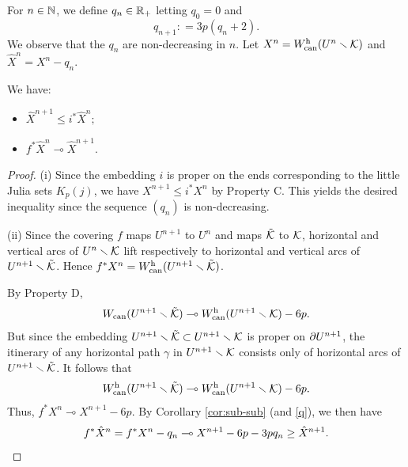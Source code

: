 \begin{center}
\end{center}

For $n \in {\Bbb N}$, 
we define $q_n\in {\Bbb R}_+$ letting $q_0 = 0$ and 
\begin{equation}\label{q}
                 q_{n+1}: =  3p(q_n+2).
\end{equation}
We observe that the $q_n$ are non-decreasing in $n$. 
Let $X^n = W_{\mathrm{can}}^{\mathrm{h}} (U^n\smallsetminus {\mathcal K})$ and $\hat X^n= X^n- q_n$.

\begin{prop}\label{restrictions}
  We have:
\begin{itemize}

\item [(i)] $\hat X^{n+1} \leq i^* \hat X^n;$

\item [(ii)] $f^* \hat X^n\multimap \hat X^{n+1}.$

\end{itemize}
\end{prop}

\begin{proof} (i)
Since the embedding $i$ is proper on the ends corresponding to the little Julia sets $K_p(j)$,
we have  $X^{n+1} \leq i^* X^n$ by Property C.
This yields the desired inequality
since the sequence $(q_n)$ is non-decreasing.

\msk (ii)
Since the covering $f$ maps $U^{n+1}$ to $U^n$ and maps $\tilde{{\mathcal K}}$ to ${\mathcal K}$,
horizontal and vertical  arcs of $U^n\smallsetminus {\mathcal K}$ lift respectively to horizontal and vertical arcs
of $U^{n+1}\smallsetminus \tilde {{\mathcal K}}$. Hence  $f^* X^n = W_{\mathrm{can}}^{\mathrm{h}}(U^{n+1}\smallsetminus \tilde{{\mathcal K}})$.

By Property D,
$$
   W_{\mathrm{can}}(U^{n+1}\smallsetminus \tilde{{\mathcal K}}) \multimap W_{\mathrm{can}}^{\mathrm{h}} (U^{n+1}\smallsetminus {\mathcal K})- 6p.
$$
But since the embedding  $U^{n+1}\smallsetminus \tilde {{\mathcal K}} \subset U^{n+1}\smallsetminus {\mathcal K}$
is proper on $\partial U^{n+1}$, the itinerary of any horizontal path $\gamma$ in $U^{n+1}\smallsetminus {\mathcal K}$
consists only of horizontal arcs of $U^{n+1}\smallsetminus\tilde{{\mathcal K}}$.
It follows that
$$
  W_{\mathrm{can}}^{\mathrm{h}}(U^{n+1} \smallsetminus \tilde{{\mathcal K}}) \multimap W_{\mathrm{can}}^{\mathrm{h}} (U^{n+1}\smallsetminus {\mathcal K})-6p.
$$
Thus,
$
     f^* X^n \multimap X^{n+1} - 6p.
$
By Corollary \ref{cor:sub-sub} (and \eqref{q}), we then have
$$
  f^* \hat X^n = f^* X^n - q_n \multimap X^{n+1} -6p - 3p q_n \geq \hat X^{n+1}. \qedhere
$$
\end{proof}

